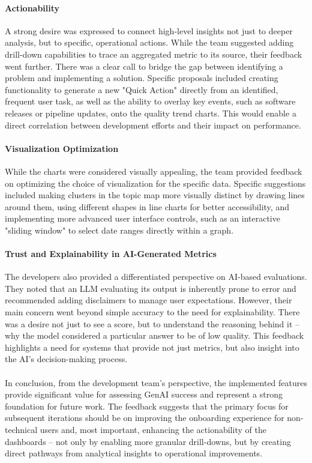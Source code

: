 \documentclass[
	english,
	ruledheaders=section,%
	class=report,%
	thesis={type=bachelor},%
	accentcolor=1b,%
	custommargins=true,%
	marginpar=false,%
	parskip=half-,%
	fontsize=11pt,%
	DIV=14,
]{tudapub}
\begin{document}
\paragraph{Actionability} A strong desire was expressed to connect high-level insights not just to deeper analysis, but to specific, operational actions. While the team suggested adding drill-down capabilities to trace an aggregated metric to its source, their feedback went further. There was a clear call to bridge the gap between identifying a problem and implementing a solution. Specific proposals included creating functionality to generate a new "Quick Action" directly from an identified, frequent user task, as well as the ability to overlay key events, such as software releases or pipeline updates, onto the quality trend charts. This would enable a direct correlation between development efforts and their impact on performance.
\paragraph{Visualization Optimization} While the charts were considered visually appealing, the team provided feedback on optimizing the choice of visualization for the specific data. Specific suggestions included making clusters in the topic map more visually distinct by drawing lines around them, using different shapes in line charts for better accessibility, and implementing more advanced user interface controls, such as an interactive "sliding window" to select date ranges directly within a graph.
\paragraph{Trust and Explainability in AI-Generated Metrics} The developers also provided a differentiated perspective on AI-based evaluations. They noted that an LLM evaluating its output is inherently prone to error and recommended adding disclaimers to manage user expectations. However, their main concern went beyond simple accuracy to the need for explainability. There was a desire not just to see a score, but to understand the reasoning behind it -- why the model considered a particular answer to be of low quality. This feedback highlights a need for systems that provide not just metrics, but also insight into the AI's decision-making process.\\
\\
In conclusion, from the development team's perspective, the implemented features provide significant value for assessing GenAI success and represent a strong foundation for future work. The feedback suggests that the primary focus for subsequent iterations should be on improving the onboarding experience for non-technical users and, most important, enhancing the actionability of the dashboards -- not only by enabling more granular drill-downs, but by creating direct pathways from analytical insights to operational improvements.
\end{document}

